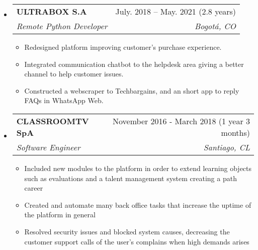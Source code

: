 \documentclass[letterpaper,12pt]{article}[leftmargin=*]
\makeatletter
\def \entryspacing {-0pt}
\renewcommand{\section}[2]{\vspace{5pt}
  \colorbox{secondary}{\color{white}\raggedbottom\normalsize\textbf{{#1}{\hspace{7pt}#2}}}
}
\newcommand{\resumeEntryStart}{\begin{itemize}[leftmargin=2.5mm]}
\newcommand{\resumeEntryEnd}{\end{itemize}\vspace{\entryspacing}}
\newcommand{\resumeItemListStart}{\begin{itemize}[leftmargin=4.5mm]}
\newcommand{\resumeItemListEnd}{\end{itemize}}
\newcommand{\resumeItem}[1]{
  \item\small{
    {#1 \vspace{-2pt}}
  }
}
\newcommand{\resumeEntryTSDL}[4]{
  \vspace{-1pt}\item[]
    \begin{tabularx}{0.97\textwidth}{X@{\hspace{60pt}}r}
      \textbf{\color{primary}#1} & {\firabook\color{accent}\small#2} \\
      \textit{\color{accent}\small#3} & \textit{\color{accent}\small#4} \\
    \end{tabularx}\vspace{-6pt}
}
\makeatother
\begin{document}
  \resumeEntryStart
    \resumeEntryTSDL
      {ULTRABOX S.A}{July. 2018 -- May. 2021 (2.8 years)}
      {Remote Python Developer}{Bogotá, CO}
    \resumeItemListStart
    Import and transport product company to Colombia and other latinamerican countries. It integrates international e-commerce and several payment methods.

      \resumeItem {Redesigned platform improving customer’s purchase experience.}
      \resumeItem {Integrated communication chatbot to the helpdesk area giving a better channel to help customer issues.}
      \resumeItem {Constructed a webscraper to Techbargains, and an short app to reply FAQs in WhatsApp Web.}
    \resumeItemListEnd
  \resumeEntryEnd


  \resumeEntryStart
    \resumeEntryTSDL
      {CLASSROOMTV SpA}{November 2016 - March 2018 (1 year 3 months)}
      {Software Engineer}{Santiago, CL}
    \resumeItemListStart
        E-learning Company, integrated with SENCE (state entity) with custom course and own audiovisual production

      \resumeItem {Included new modules to the platform in order to extend learning objects such as evaluations and a talent management system creating a path career}
      \resumeItem {Created and automate many back office tasks that increase the uptime of the platform in general}
      \resumeItem {Resolved security issues and blocked system causes, decreasing the customer support calls of the user’s complains when high demands arises}
    \resumeItemListEnd
  \resumeEntryEnd


\end{document}
